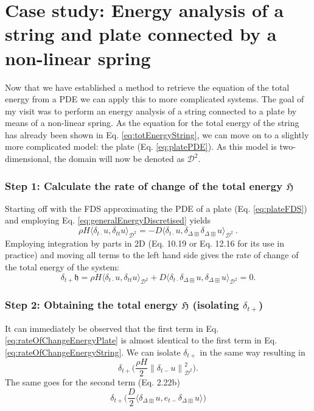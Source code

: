 \documentclass{article}
\begin{document}
\section{Case study: Energy analysis of a string and plate connected by a non-linear spring}
Now that we have established a method to retrieve the equation of the total energy from a PDE we can apply this to more complicated systems. The goal of my visit was to perform an energy analysis of a string connected to a plate by means of a non-linear spring. As the equation for the total energy of the string has already been shown in Eq. \eqref{eq:totEnergyString}, we can move on to a slightly more complicated model: the plate (Eq. \eqref{eq:platePDE}). As this model is two-dimensional, the domain will now be denoted as $\mathcal{D}^2$. 
\subsubsection*{Step 1: Calculate the rate of change of the total energy $\mathfrak{H}$}
Starting off with the FDS approximating the PDE of a plate (Eq. \eqref{eq:plateFDS}) and employing Eq. \eqref{eq:generalEnergyDiscretised} yields
\begin{equation}
    \rho H \langle \delta_{t\cdot} u, \delta_{tt}u\rangle_{\mathcal{D}^2} = -D\langle\delta_{t\cdot}u,\delta_{\Delta\boxplus}\delta_{\Delta\boxplus}u\rangle_{\mathcal{D}^2}\ .
\end{equation}
Employing integration by parts in 2D (Eq. 10.19 or Eq. 12.16 for its use in practice) and moving all terms to the left hand side gives the rate of change of the total energy of the system:
\begin{equation}\label{eq:rateOfChangeEnergyPlate}
    \delta_{t+} \mathfrak{h} = \rho H \langle \delta_{t\cdot} u, \delta_{tt}u\rangle_{\mathcal{D}^2} + D\langle\delta_{t\cdot}\delta_{\Delta\boxplus}u,\delta_{\Delta\boxplus}u\rangle_{\mathcal{D}^2} = 0.
\end{equation}
\subsubsection*{Step 2: Obtaining the total energy $\mathfrak{H}$ (isolating $\delta_{t+}$)}
It can immediately be observed that the first term in Eq. \eqref{eq:rateOfChangeEnergyPlate} is almost identical to the first term in Eq. \eqref{eq:rateOfChangeEnergyString}. We can isolate $\delta_{t+}$ in the same way resulting in
\begin{equation}
    \delta_{t+}\Bigg(\frac{\rho H}{2} \left\lVert\delta_{t-}u\right\rVert_{\mathcal{D}^2}^2\Bigg).
\end{equation}
The same goes for the second term (Eq. 2.22b)
\begin{equation}
    \delta_{t+}\Bigg(\frac{D}{2}\langle\delta_{\Delta\boxplus} u, e_{t-}\delta_{\Delta\boxplus} u\rangle\Bigg)
\end{equation}
\end{document}
